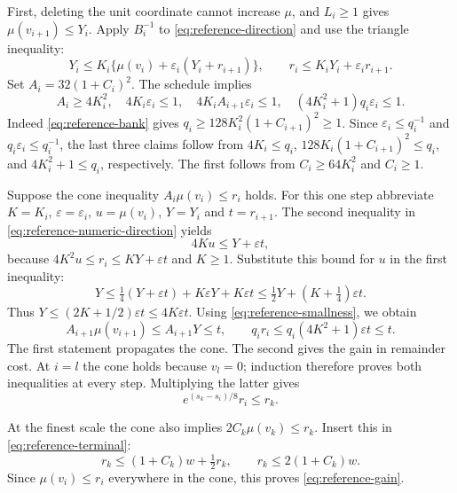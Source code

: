 First, deleting the unit coordinate cannot increase $\mu$, and
$L_i\ge1$ gives $\mu(v_{i+1})\le Y_i$. Apply $B_i^{-1}$ to
\eqref{eq:reference-direction} and use the triangle inequality:
\begin{equation}\label{eq:reference-numeric-direction}
 Y_i\le K_i\{\mu(v_i)+\varepsilon_i(Y_i+r_{i+1})\},
 \qquad r_i\le K_iY_i+\varepsilon_i r_{i+1}.
\end{equation}
Set $A_i=32(1+C_i)^2$. The schedule implies
\begin{equation}\label{eq:reference-smallness}
 A_i\ge4K_i^2,\quad
 4K_i\varepsilon_i\le1,\quad
 4K_iA_{i+1}\varepsilon_i\le1,\quad
 (4K_i^2+1)q_i\varepsilon_i\le1.
\end{equation}
Indeed \eqref{eq:reference-bank} gives
$q_i\ge128K_i^2(1+C_{i+1})^2\ge1$.
Since $\varepsilon_i\le q_i^{-1}$ and
$q_i\varepsilon_i\le q_i^{-1}$, the last three claims follow
from $4K_i\le q_i$, $128K_i(1+C_{i+1})^2\le q_i$, and
$4K_i^2+1\le q_i$, respectively. The first follows from
$C_i\ge64K_i^2$ and $C_i\ge1$.

Suppose the cone inequality $A_i\mu(v_i)\le r_i$ holds.
For this one step abbreviate $K=K_i$, $\varepsilon=\varepsilon_i$,
$u=\mu(v_i)$, $Y=Y_i$ and $t=r_{i+1}$. The second inequality
in \eqref{eq:reference-numeric-direction} yields
\[
              4Ku\le Y+\varepsilon t,
\]
because $4K^2u\le r_i\le KY+\varepsilon t$
and $K\ge1$. Substitute this bound for $u$ in the first inequality:
\[
 Y\le\tfrac14(Y+\varepsilon t)
                 +K\varepsilon Y+K\varepsilon t
       \le\tfrac12Y+(K+\tfrac14)\varepsilon t.
\]
Thus $Y\le(2K+1/2)\varepsilon t\le4K\varepsilon t$.
Using \eqref{eq:reference-smallness}, we obtain
\[
 A_{i+1}\mu(v_{i+1})\le A_{i+1}Y\le t,
 \qquad q_ir_i\le q_i(4K^2+1)\varepsilon t\le t.
\]
The first statement propagates the cone. The second gives the
gain in remainder cost. At $i=l$ the cone holds because $v_l=0$;
induction therefore proves both inequalities at every step.
Multiplying the latter gives
\[
               e^{(s_k-s_i)/8}r_i\le r_k.
\]

At the finest scale the cone also implies
$2C_k\mu(v_k)\le r_k$. Insert this in
\eqref{eq:reference-terminal}:
\[
                r_k\le(1+C_k)w+\tfrac12r_k,
 \qquad r_k\le2(1+C_k)w.
\]
Since $\mu(v_i)\le r_i$ everywhere in the cone, this proves
\eqref{eq:reference-gain}.


